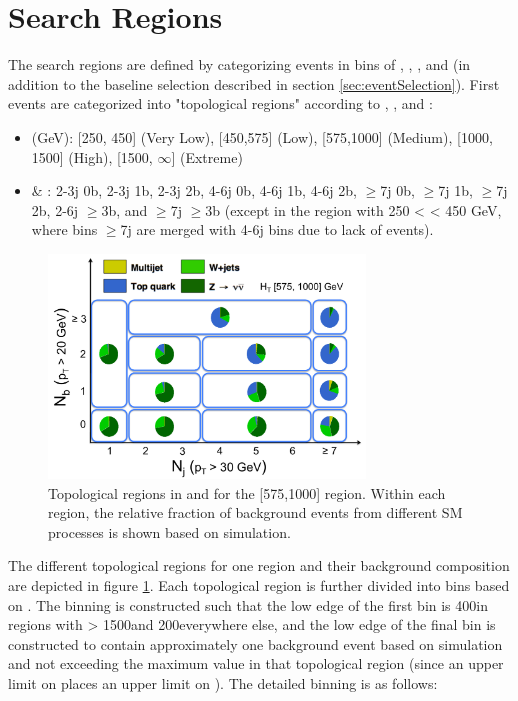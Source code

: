 \section{Search Regions}
\label{sec:searchRegions}
The search regions are defined by categorizing events in bins of \HT, \nj, \nb, and \mttwo (in addition to the baseline selection described in section \ref{sec:eventSelection}). First events are categorized into "topological regions" according to \HT, \nj, and \nb:
\begin{itemize}
	\item \HT (GeV): [250, 450] (Very Low), [450,575] (Low), [575,1000] (Medium), [1000, 1500] (High), [1500, $\infty$] (Extreme)
	\item \nj \& \nb: 2-3j 0b, 2-3j 1b, 2-3j 2b, 4-6j 0b, 4-6j 1b, 4-6j 2b, $\geq$7j 0b, $\geq$7j 1b, $\geq$7j 2b, 2-6j $\geq$3b, and $\geq$7j $\geq$3b (except in the region with 250 < \HT < 450 GeV, where bins $\geq$7j are merged with 4-6j bins due to lack of events).
\end{itemize}
\begin{figure}
	\centering
	\includegraphics[width=0.75\textwidth]{analysis/figs/bkgComposition_HTlabel}
	\caption{Topological regions in \nj and \nb for the [575,1000] \HT region. Within each region, the relative fraction of background events from different SM processes is shown based on simulation.}
	\label{fig:topologicalRegions}
\end{figure}
The different topological regions for one \HT region and their background composition are depicted in figure \ref{fig:topologicalRegions}. Each topological region is further divided into bins based on \mttwo. The \mttwo binning is constructed such that the low edge of the first bin is 400\GeV in regions with \HT > 1500\GeV and 200\GeV everywhere else, and the low edge of the final bin is constructed to contain approximately one background event based on simulation and not exceeding the maximum \HT value in that topological region (since an upper limit on \HT places an upper limit on \mttwo). The detailed \mttwo binning is as follows:

